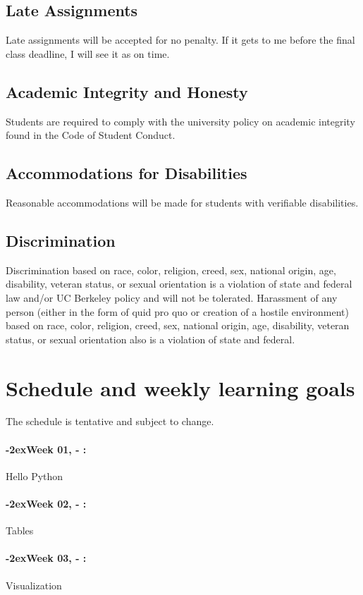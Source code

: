 \documentclass[11pt]{article}
\newcommand{\week}[1]{%
  \paragraph*{\kern-2ex\quad #1, \syldate{\today} - \AdvanceDate[4]\syldate{\today}:}%
  \ifdim\wd1=\wd\MONDAY
    \AdvanceDate[7]
  \else
    \AdvanceDate[7]
  \fi%
}
\begin{document}
\subsection*{Late Assignments}
\footnotesize{Late assignments will be accepted for no penalty. If it gets to me before the final class deadline, I will see it as on time.}

\subsection*{Academic Integrity and Honesty}
\footnotesize{Students are required to comply with the university policy on academic integrity found in the Code of Student Conduct.}

\subsection*{Accommodations for Disabilities}
\footnotesize{Reasonable accommodations will be made for students with verifiable disabilities.}

\subsection*{Discrimination}
\footnotesize{Discrimination based on race, color, religion, creed, sex, national origin, age, disability, veteran status, or sexual orientation is a violation of state and federal law and/or UC Berkeley policy and will not be tolerated. Harassment of any person (either in the form of quid pro quo or creation of a hostile environment) based on race, color, religion, creed, sex, national origin, age, disability, veteran status, or sexual orientation also is a violation of state and federal.}


\newpage
\section*{Schedule and weekly learning goals}

The schedule is tentative and subject to change.

\SetDate[01/01/2018]
\week{Week 01} Hello Python


\week{Week 02} Tables


\week{Week 03} Visualization
\end{document}

